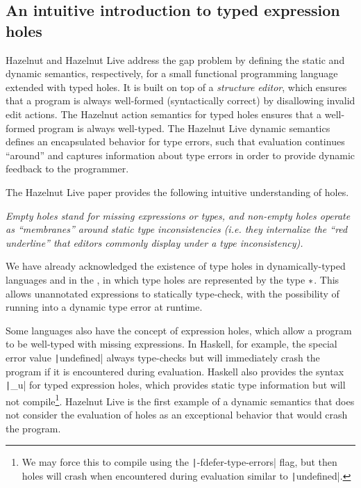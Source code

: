 \subsection{An intuitive introduction to typed expression holes}
\label{sec:typed-holes}

Hazelnut and Hazelnut Live address the gap problem by defining the static and dynamic semantics, respectively, for a small functional programming language extended with typed holes. It is built on top of a \textit{structure editor}, which ensures that a program is always well-formed (syntactically correct) by disallowing invalid edit actions. The Hazelnut action semantics for typed holes ensures that a well-formed program is always well-typed. The Hazelnut Live dynamic semantics defines an encapsulated behavior for type errors, such that evaluation continues ``around'' and captures information about type errors in order to provide dynamic feedback to the programmer.

The Hazelnut Live paper provides the following intuitive understanding of holes.

\begin{displayquote}
\textit{  Empty holes stand for missing expressions or types, and non-empty holes operate as ``membranes''
around static type inconsistencies (i.e. they internalize the ``red underline'' that editors commonly display under a type inconsistency).
}\end{displayquote}

We have already acknowledged the existence of type holes in dynamically-typed languages and in the \gtclc{}, in which type holes are represented by the type $*$. This allows unannotated expressions to statically type-check, with the possibility of running into a dynamic type error at runtime.

Some languages also have the concept of expression holes, which allow a program to be well-typed with missing expressions. In Haskell, for example, the special error value \texttt|undefined| always type-checks but will immediately crash the program if it is encountered during evaluation. Haskell also provides the syntax \texttt|_u| for typed expression holes, which provides static type information but will not compile\footnote{We may force this to compile using the \texttt|-fdefer-type-errors| flag, but then holes will crash when encountered during evaluation similar to \texttt|undefined|.}. Hazelnut Live is the first example of a dynamic semantics that does not consider the evaluation of holes as an exceptional behavior that would crash the program.

